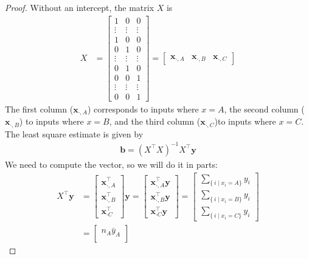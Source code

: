 \documentclass[12pt]{article}
\begin{document}
\begin{enumerate}
\begin{proof}
	Without an intercept, the matrix $X$ is
	\begin{align*}
		X &= \begin{bmatrix}
			1 & 0 & 0\\
			\vdots & \vdots & \vdots\\
			1 & 0 & 0\\
			0 & 1 & 0\\
			\vdots & \vdots & \vdots\\
			0 & 1 & 0 \\
			0 & 0 & 1\\
			\vdots & \vdots & \vdots\\
			0 & 0 & 1
		\end{bmatrix}
		=\begin{bmatrix}
			\mathbf{x}_{\cdot, A} & \mathbf{x}_{\cdot, B} & \mathbf{x}_{\cdot, C}
		\end{bmatrix}
	\end{align*}
	The first column ($\mathbf{x}_{\cdot, A}$) corresponds to inputs where $x=A$,
	the second column ($\mathbf{x}_{\cdot, B}$) to inputs where $x=B$, and the third
	column ($\mathbf{x}_{\cdot, C}$)to inputs where $x=C$. The least square estimate
	is given by
	\begin{align*}
		\mathbf{b}=(X^\top X)^{-1}X^\top \mathbf{y}
	\end{align*}
	We need to compute the vector, so we will do it in parts:
	\begin{align*}
		X^\top \mathbf{y}
		&=\begin{bmatrix}
			\mathbf{x}_{\cdot, A}^\top\\
			\mathbf{x}_{\cdot, B}^\top\\
			\mathbf{x}_{\cdot C}^\top
		\end{bmatrix}
		\mathbf{y}
		=\begin{bmatrix}
			\mathbf{x}_{\cdot, A}^\top\mathbf{y}\\
			\mathbf{x}_{\cdot, B}^\top\mathbf{y} \\
			\mathbf{x}_{\cdot C}^\top\mathbf{y}
		\end{bmatrix}
		=\begin{bmatrix}
			\sum_{ \{\, i \mid x_i=A\} }y_i\\
			\sum_{ \{\, i \mid x_i=B\} }y_i\\
			\sum_{ \{\, i \mid x_i=C\} }y_i
		\end{bmatrix}\\
		&=\begin{bmatrix}
			n_A\bar{y}_A\\

\end{bmatrix}
\end{align*}
\end{proof}
\end{enumerate}
\end{document}

